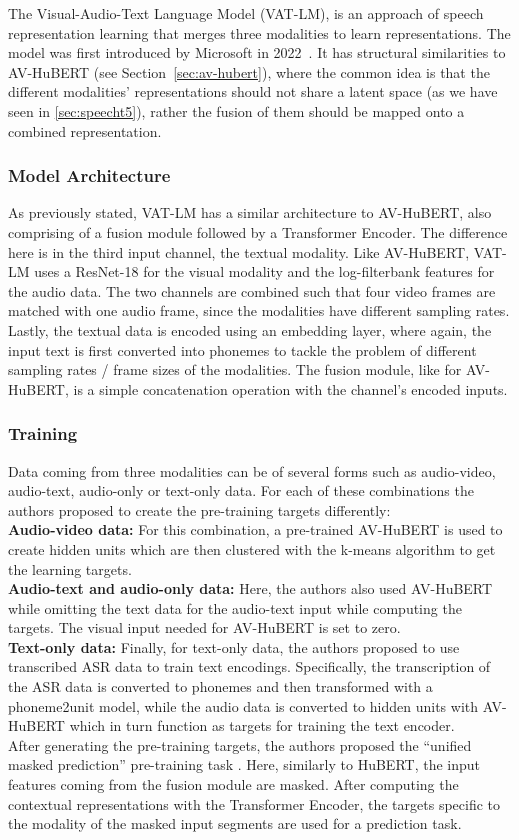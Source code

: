 The Visual-Audio-Text Language Model (VAT-LM), is an approach of speech representation learning that merges three modalities to learn representations. The model was first introduced by Microsoft in 2022~\cite{vatlm}. It has structural similarities to AV-HuBERT (see Section~\ref{sec:av-hubert}), where the common idea is that the different modalities' representations should not share a latent space (as we have seen in \ref{sec:speecht5}), rather the fusion of them should be mapped onto a combined representation.
\subsubsection{Model Architecture}
As previously stated, VAT-LM has a similar architecture to AV-HuBERT, also comprising of a fusion module followed by a Transformer Encoder. The difference here is in the third input channel, the textual modality. Like AV-HuBERT, VAT-LM uses a ResNet-18 for the visual modality and the log-filterbank features for the audio data. The two channels are combined such that four video frames are matched with one audio frame, since the modalities have different sampling rates. Lastly, the textual data is encoded using an embedding layer, where again, the input text is first converted into phonemes to tackle the problem of different sampling rates / frame sizes of the modalities. The fusion module, like for AV-HuBERT, is a simple concatenation operation with the channel's encoded inputs.
\subsubsection{Training}
Data coming from three modalities can be of several forms such as audio-video, audio-text, audio-only or text-only data. For each of these combinations the authors proposed to create the pre-training targets differently:\\
\textbf{Audio-video data:} For this combination, a pre-trained AV-HuBERT is used to create hidden units which are then clustered with the k-means algorithm to get the learning targets.\\
\textbf{Audio-text and audio-only data:} Here, the authors also used AV-HuBERT while omitting the text data for the audio-text input while computing the targets. The visual input needed for AV-HuBERT is set to zero.\\
\textbf{Text-only data:} Finally, for text-only data, the authors proposed to use transcribed ASR data to train text encodings. Specifically, the transcription of the ASR data is converted to phonemes and then transformed with a phoneme2unit model, while the audio data is converted to hidden units with AV-HuBERT which in turn function as targets for training the text encoder.\\
After generating the pre-training targets, the authors proposed the ``unified masked prediction'' pre-training task \cite{vatlm}. Here, similarly to HuBERT, the input features coming from the fusion module are masked. After computing the contextual representations with the Transformer Encoder, the targets specific to the modality of the masked input segments are used for a prediction task.
